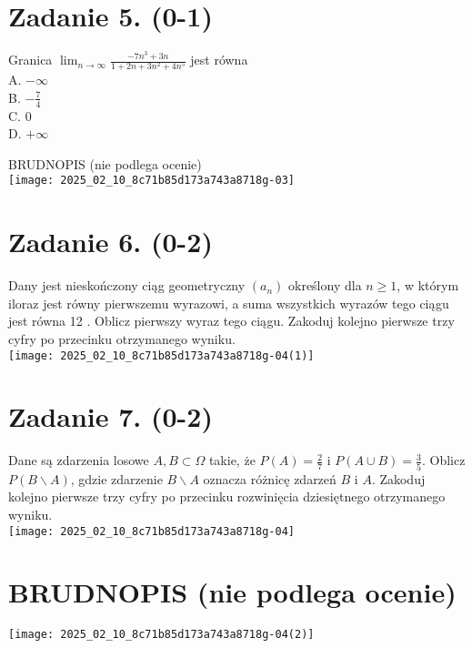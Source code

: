 \documentclass[10pt]{article}
\begin{document}
\section*{Zadanie 5. (0-1)}
Granica \(\lim _{n \rightarrow \infty} \frac{-7 n^{3}+3 n}{1+2 n+3 n^{2}+4 n^{5}}\) jest równa\\
A. \(-\infty\)\\
B. \(-\frac{7}{4}\)\\
C. 0\\
D. \(+\infty\)

BRUDNOPIS (nie podlega ocenie)\\
\texttt{[image: 2025\_02\_10\_8c71b85d173a743a8718g-03]}

\section*{Zadanie 6. (0-2)}
Dany jest nieskończony ciąg geometryczny \(\left(a_{n}\right)\) określony dla \(n \geq 1\), w którym iloraz jest równy pierwszemu wyrazowi, a suma wszystkich wyrazów tego ciągu jest równa 12 . Oblicz pierwszy wyraz tego ciągu. Zakoduj kolejno pierwsze trzy cyfry po przecinku otrzymanego wyniku.\\
\texttt{[image: 2025\_02\_10\_8c71b85d173a743a8718g-04(1)]}

\section*{Zadanie 7. (0-2)}
Dane są zdarzenia losowe \(A, B \subset \Omega\) takie, że \(P(A)=\frac{2}{7}\) i \(P(A \cup B)=\frac{3}{5}\). Oblicz \(P(B \backslash A)\), gdzie zdarzenie \(B \backslash A\) oznacza różnicę zdarzeń \(B\) i \(A\). Zakoduj kolejno pierwsze trzy cyfry po przecinku rozwinięcia dziesiętnego otrzymanego wyniku.\\
\texttt{[image: 2025\_02\_10\_8c71b85d173a743a8718g-04]}

\section*{BRUDNOPIS (nie podlega ocenie)}
\begin{center}
\texttt{[image: 2025\_02\_10\_8c71b85d173a743a8718g-04(2)]}
\end{center}
\end{document}
